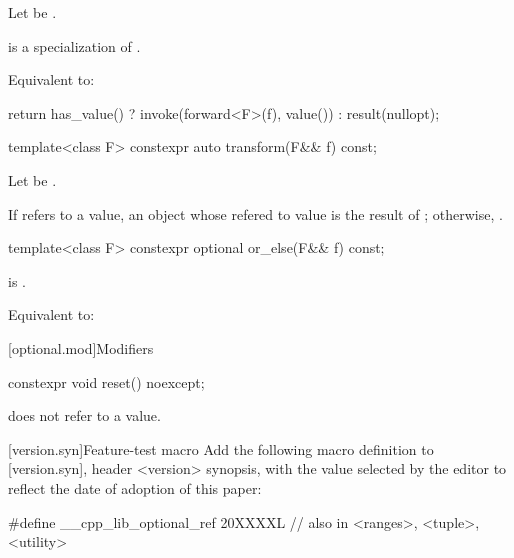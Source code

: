   \begin{itemdescr}
    \pnum
    Let  be .

    \pnum
    \mandates
     is a specialization of .

    \pnum
    \effects
    Equivalent to:
    \begin{codeblock}
      return has_value() ? invoke(forward<F>(f), value()) : result(nullopt);
    \end{codeblock}
  \end{itemdescr}

  \begin{itemdecl}
    template<class F> constexpr auto transform(F&& f) const;
  \end{itemdecl}

  \begin{itemdescr}
    \pnum
    Let  be .


    \pnum
    \returns
    If  refers to a value, an  object
    whose refered to value is the result of
    ;
    otherwise, .
  \end{itemdescr}

  \begin{itemdecl}
    template<class F> constexpr optional or_else(F&& f) const;
  \end{itemdecl}

  \begin{itemdescr}
    \pnum
    \mandates
     is .

    \pnum
    \effects
    Equivalent to:
    \begin{codeblock}
      if (has_value()))
        return value()
      else
        return forward<F>(f)();
      }
    \end{codeblock}
  \end{itemdescr}

  [optional.mod]{Modifiers}

  \begin{itemdecl}
    constexpr void reset() noexcept;
  \end{itemdecl}

  \begin{itemdescr}

    \pnum
    \ensures
     does not refer to a value.
  \end{itemdescr}

[version.syn]{Feature-test macro}
Add the following macro definition to [version.syn], header <version> synopsis, with the value selected by the editor to reflect the date of adoption of this paper:

\begin{codeblock}
  #define __cpp_lib_optional_ref 20XXXXL // also in <ranges>, <tuple>, <utility>
\end{codeblock}

